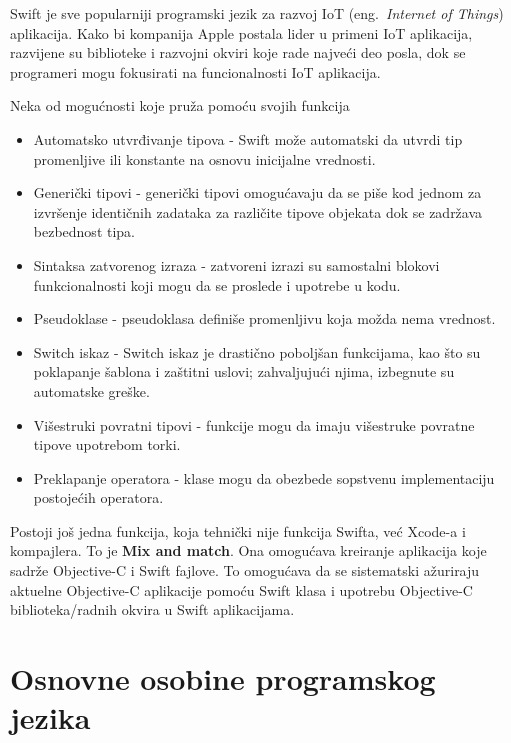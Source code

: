\documentclass[a4paper]{article}
\begin{document}
Swift je sve popularniji programski jezik za razvoj IoT (eng.~{\em Internet of Things}) aplikacija. Kako bi kompanija Apple postala lider u primeni IoT aplikacija, razvijene su biblioteke i razvojni okviri koje rade najveći deo posla, dok se programeri mogu fokusirati na funcionalnosti IoT aplikacija.

Neka od mogućnosti koje pruža pomoću svojih funkcija \cite{mastering_swift3}
\begin{itemize}
\item Automatsko utvrđivanje tipova - Swift može automatski da utvrdi tip promenljive ili konstante na osnovu inicijalne
vrednosti. 
\item Generički tipovi - generički tipovi omogućavaju da se piše kod jednom za izvršenje identičnih
zadataka za različite tipove objekata dok se zadržava bezbednost tipa. 
\item Sintaksa zatvorenog izraza - zatvoreni izrazi su samostalni blokovi funkcionalnosti koji mogu da se proslede i upotrebe u kodu.
\item Pseudoklase - pseudoklasa definiše promenljivu koja možda nema vrednost.
\item Switch iskaz - Switch iskaz je drastično poboljšan funkcijama, kao što su poklapanje šablona i
zaštitni uslovi; zahvaljujući njima, izbegnute su automatske greške.
\item Višestruki povratni tipovi - funkcije mogu da imaju višestruke povratne tipove upotrebom torki. 
\item Preklapanje operatora - klase mogu da obezbede sopstvenu implementaciju postojećih operatora. 
\end{itemize}

Postoji još jedna funkcija, koja tehnički nije
funkcija Swifta, već Xcode-a i kompajlera. To je \textbf{Mix and match}. Ona omogućava kreiranje aplikacija koje sadrže Objective-C i Swift fajlove. To omogućava da se sistematski ažuriraju aktuelne Objective-C aplikacije pomoću Swift klasa i upotrebu Objective-C biblioteka/radnih okvira u Swift aplikacijama.

\section{Osnovne osobine programskog jezika}	
\label{sec:treciDeo}
\end{document}
